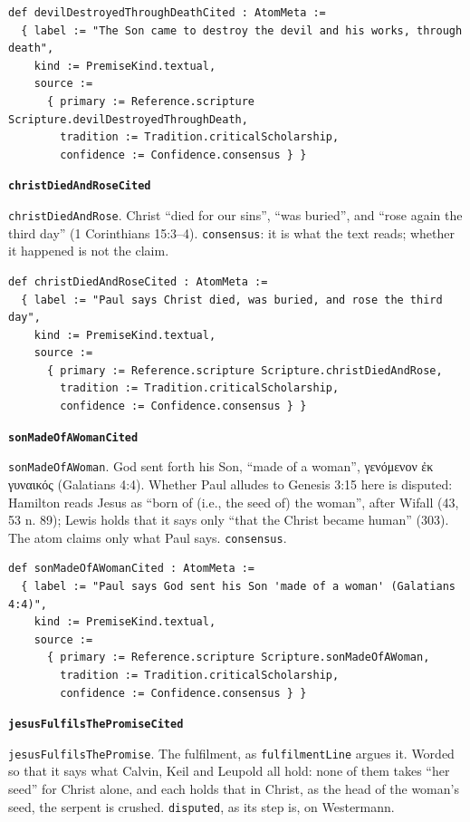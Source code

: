 \documentclass[11pt]{article}
\begin{document}
{\small\begin{verbatim}
def devilDestroyedThroughDeathCited : AtomMeta :=
  { label := "The Son came to destroy the devil and his works, through death",
    kind := PremiseKind.textual,
    source :=
      { primary := Reference.scripture Scripture.devilDestroyedThroughDeath,
        tradition := Tradition.criticalScholarship,
        confidence := Confidence.consensus } }
\end{verbatim}}
\par\medskip\noindent\textbf{\texttt{christ\allowbreak{}Died\allowbreak{}And\allowbreak{}Rose\allowbreak{}Cited}}\par\nobreak\noindent
\texttt{christ\allowbreak{}Died\allowbreak{}And\allowbreak{}Rose}. Christ “died for our sins”, “was buried”, and “rose again the third day” (1 Corinthians 15:3–4). \texttt{consensus}: it is what the text reads; whether it happened is not the claim.

{\small\begin{verbatim}
def christDiedAndRoseCited : AtomMeta :=
  { label := "Paul says Christ died, was buried, and rose the third day",
    kind := PremiseKind.textual,
    source :=
      { primary := Reference.scripture Scripture.christDiedAndRose,
        tradition := Tradition.criticalScholarship,
        confidence := Confidence.consensus } }
\end{verbatim}}
\par\medskip\noindent\textbf{\texttt{son\allowbreak{}Made\allowbreak{}Of\allowbreak{}AWoman\allowbreak{}Cited}}\par\nobreak\noindent
\texttt{son\allowbreak{}Made\allowbreak{}Of\allowbreak{}AWoman}. God sent forth his Son, “made of a woman”, γενόμενον ἐκ γυναικός (Galatians 4:4). Whether Paul alludes to Genesis 3:15 here is disputed: Hamilton reads Jesus as “born of (i.e., the seed of) the woman”, after Wifall (43, 53 n. 89); Lewis holds that it says only “that the Christ became human” (303). The atom claims only what Paul says. \texttt{consensus}.

{\small\begin{verbatim}
def sonMadeOfAWomanCited : AtomMeta :=
  { label := "Paul says God sent his Son 'made of a woman' (Galatians 4:4)",
    kind := PremiseKind.textual,
    source :=
      { primary := Reference.scripture Scripture.sonMadeOfAWoman,
        tradition := Tradition.criticalScholarship,
        confidence := Confidence.consensus } }
\end{verbatim}}
\par\medskip\noindent\textbf{\texttt{jesus\allowbreak{}Fulfils\allowbreak{}The\allowbreak{}Promise\allowbreak{}Cited}}\par\nobreak\noindent
\texttt{jesus\allowbreak{}Fulfils\allowbreak{}The\allowbreak{}Promise}. The fulfilment, as \texttt{fulfilment\allowbreak{}Line} argues it. Worded so that it says what Calvin, Keil and Leupold all hold: none of them takes “her seed” for Christ alone, and each holds that in Christ, as the head of the woman’s seed, the serpent is crushed. \texttt{disputed}, as its step is, on Westermann.
\end{document}
